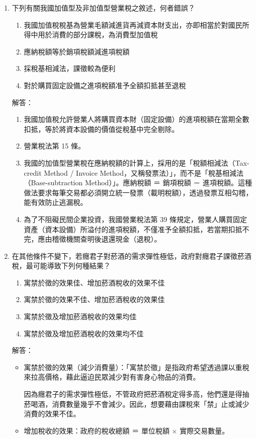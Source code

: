\documentclass[12pt, a4paper]{article}
\begin{document}
\begin{enumerate}
    \item 下列有關我國加值型及非加值型營業稅之敘述，何者錯誤？
    \begin{enumerate}[label=\Alph*.]
        \item 我國加值稅稅基為營業毛額減進貨再減資本財支出，亦即相當於對國民所得中用於消費的部分課稅，為消費型加值稅
        \item 應納稅額等於銷項稅額減進項稅額
        \item 採稅基相減法，課徵較為便利
        \item 對於購買固定設備之進項稅額准予全額扣抵甚至退稅
    \end{enumerate}
    解答：
    \begin{enumerate}[label=\Alph*.]
        \item 我國加值稅允許營業人將購買資本財（固定設備）的進項稅額在當期全數扣抵，等於將資本設備的價值從稅基中完全剔除。
        \item 營業稅法第 15 條。
        \item 我國的加值型營業稅在應納稅額的計算上，採用的是「稅額相減法（Tax-credit Method / Invoice Method，又稱發票法）」，而不是「稅基相減法（Base-subtraction Method）」。應納稅額 ＝ 銷項稅額 － 進項稅額。這種做法要求每筆交易都必須開立統一發票（載明稅額），透過發票互相勾稽，能有效防止逃漏稅。
        \item 為了不阻礙民間企業投資，我國營業稅法第 39 條規定，營業人購買固定資產（資本設備）所溢付的進項稅額，不僅准予全額扣抵，若當期扣抵不完，應由稽徵機關查明後退還現金（退稅）。
    \end{enumerate}

    \item 在其他條件不變下，若癮君子對菸酒的需求彈性極低，政府對癮君子課徵菸酒稅，最可能導致下列何種結果？
    \begin{enumerate}[label=\Alph*.]
        \item 寓禁於徵的效果佳、增加菸酒稅收的效果不佳
        \item 寓禁於徵的效果不佳、增加菸酒稅收的效果佳
        \item 寓禁於徵及增加菸酒稅收的效果均佳
        \item 寓禁於徵及增加菸酒稅收的效果均不佳
    \end{enumerate}
    解答：
    \begin{itemize}
        \item 寓禁於徵的效果（減少消費量）：「寓禁於徵」是指政府希望透過課以重稅來拉高價格，藉此逼迫民眾減少對有害身心物品的消費。

        因為癮君子的需求彈性極低，不管政府把菸酒稅定得多高，他們還是得抽菸喝酒，消費數量幾乎不會減少。因此，想要藉由課稅來「禁」止或減少消費的效果不佳。
        \item 增加稅收的效果：政府的稅收總額 ＝ 單位稅額 × 實際交易數量。


\end{itemize}
\end{enumerate}
\end{document}
